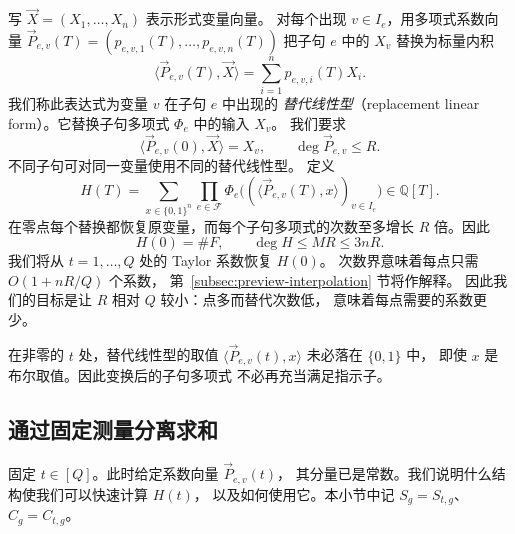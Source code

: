 \documentclass[11pt,reqno]{amsart}
\numberwithin{equation}{section}
\theoremstyle{definition}\newtheorem{definition}[theorem]{定义}
\theoremstyle{remark}\newtheorem{remark}[theorem]{注}
\renewcommand{\le}{\leqslant}
\begin{document}
写 $\vec{X}=(X_1,\ldots,X_n)$ 表示形式变量向量。
对每个出现 $v\in I_e$，用多项式系数向量
$\vec{P}_{e,v}(T)=(p_{e,v,1}(T),\ldots,p_{e,v,n}(T))$
把子句 $e$ 中的 $X_v$ 替换为标量内积
\[
 \langle \vec{P}_{e,v}(T),\vec{X}\rangle
 =\sum_{i=1}^n p_{e,v,i}(T)X_i.
\]
我们称此表达式为变量 $v$ 在子句 $e$ 中出现的
\emph{替代线性型}（replacement linear form）。它替换子句多项式
$\Phi_e$ 中的输入 $X_v$。
我们要求
\[
 \langle \vec{P}_{e,v}(0),\vec{X}\rangle=X_v,
 \qquad \deg \vec{P}_{e,v}\le R.
\]
不同子句可对同一变量使用不同的替代线性型。
定义
\begin{equation}\label{eq:simple-counting-polynomial}
 H(T)=\sum_{x\in\{0,1\}^n}\prod_{e\in\mathcal F}
       \Phi_e\bigl((\langle \vec{P}_{e,v}(T), x\rangle)_{v\in I_e}\bigr)
       \in\mathbb Q[T].
\end{equation}
在零点每个替换都恢复原变量，而每个子句多项式的次数至多增长
$R$ 倍。因此
\begin{equation}\label{eq:overview-value-degree}
 H(0)=\#F,\qquad \deg H\le MR\le3nR.
\end{equation}
我们将从 $t=1,\ldots,Q$ 处的 Taylor 系数恢复 $H(0)$。
次数界意味着每点只需 $O(1+nR/Q)$ 个系数，
第~\ref{subsec:preview-interpolation} 节将作解释。
因此我们的目标是让 $R$ 相对 $Q$ 较小：点多而替代次数低，
意味着每点需要的系数更少。

在非零的 $t$ 处，替代线性型的取值
$\langle\vec{P}_{e,v}(t),x\rangle$ 未必落在 $\{0,1\}$ 中，
即使 $x$ 是布尔取值。因此变换后的子句多项式
不必再充当满足指示子。

\subsection{通过固定测量分离求和}
\label{subsec:preview-separation}
固定 $t\in[Q]$。此时给定系数向量 $\vec{P}_{e,v}(t)$，
其分量已是常数。我们说明什么结构使我们可以快速计算 $H(t)$，
以及如何使用它。本小节中记 $S_g=S_{t,g}$、$C_g=C_{t,g}$。
\end{document}
